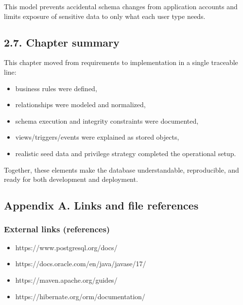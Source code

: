 This model prevents accidental schema changes from application accounts
and limits exposure of sensitive data to only what each user type needs.

\hypertarget{chapter-summary}{%
\subsection{2.7. Chapter summary}\label{chapter-summary}}

This chapter moved from requirements to implementation in a single
traceable line:

\begin{itemize}
\tightlist
\item
  business rules were defined,
\item
  relationships were modeled and normalized,
\item
  schema execution and integrity constraints were documented,
\item
  views/triggers/events were explained as stored objects,
\item
  realistic seed data and privilege strategy completed the operational
  setup.
\end{itemize}

Together, these elements make the database understandable, reproducible,
and ready for both development and deployment.

\newpage

\hypertarget{appendix-a.-links-and-file-references}{%
\subsection{Appendix A. Links and file
references}\label{appendix-a.-links-and-file-references}}

\hypertarget{external-links-references}{%
\subsubsection{External links
(references)}\label{external-links-references}}

\begin{itemize}
\tightlist
\item
  https://www.postgresql.org/docs/
\item
  https://docs.oracle.com/en/java/javase/17/
\item
  https://maven.apache.org/guides/
\item
  https://hibernate.org/orm/documentation/
\end{itemize}

